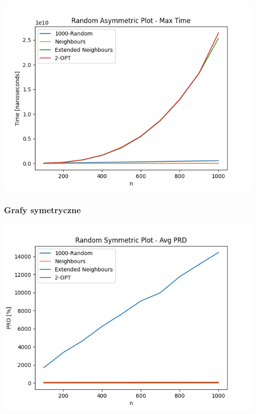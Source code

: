 \documentclass{article}
\begin{document}
\begin{center}
\includegraphics[width=\textwidth, 
                   height = 0.4\textheight, 
                   keepaspectratio]
                  {generated_asym_max_time} 
\end{center}

\subsubsection{Grafy symetryczne}

\begin{center}
\includegraphics[width=\textwidth, 
                   height = 0.4\textheight, 
                   keepaspectratio]
                  {generated_sym_avg_prd} 
\end{center}
\end{document}
